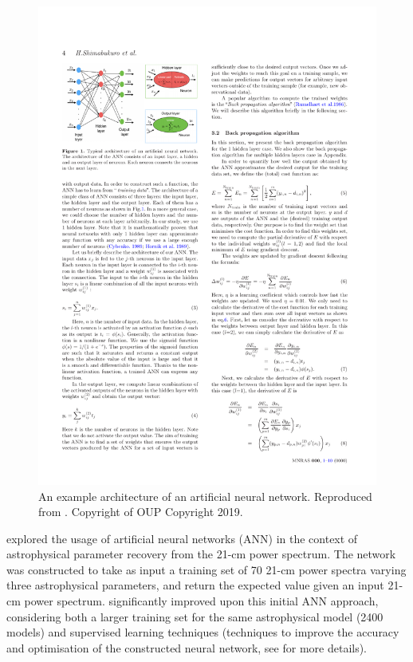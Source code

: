 \begin{figure}[]
\begin{center}
\includegraphics[trim = 0.2cm 1cm 0.2cm 0.2cm, scale = 1.20]{Greig/ANNexample}
\end{center}
\caption{An example architecture of an artificial neural network. Reproduced from \cite{Shimabukuro:2017b}. Copyright of OUP Copyright 2019.}
\label{fig:ANN}
\end{figure}

\cite{Shimabukuro:2017b} explored the usage of artificial neural networks (ANN) in the context of astrophysical parameter recovery from the 21-cm power spectrum. The network was constructed to take as input a training set of 70 21-cm power spectra varying three astrophysical parameters, and return the expected value given an input 21-cm power spectrum. \cite{Doussot:2019} significantly improved upon this initial ANN approach, considering both a larger training set for the same astrophysical model (2400 models) and supervised learning techniques (techniques to improve the accuracy and optimisation of the constructed neural network, see \cite{Doussot:2019} for more details).

